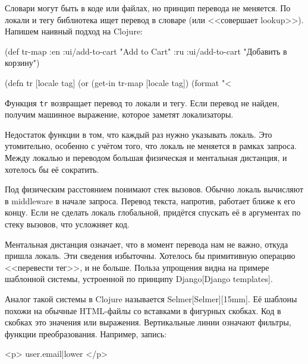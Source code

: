 Словари могут быть в коде или файлах, но принцип перевода не меняется. По локали
и тегу библиотека ищет перевод в словаре (или <<совершает lookup>>). Напишем
наивный подход на Clojure:

  \begin{clojure}
(def tr-map
  {:en {:ui/add-to-cart "Add to Cart"}
   :ru {:ui/add-to-cart "Добавить в корзину"}})

(defn tr [locale tag]
  (or (get-in tr-map [locale tag])
      (format "<%
  \end{clojure}


Функция \verb|tr| возвращает перевод то локали и тегу. Если перевод не найден,
получим машинное выражение, которое заметят локализаторы.

Недостаток функции в том, что каждый раз нужно указывать локаль. Это
утомительно, особенно с учётом того, что локаль не меняется в рамках
запроса. Между локалью и переводом большая физическая и ментальная
дистанция, и хотелось бы её сократить.


Под физическим расстоянием понимают стек вызовов. Обычно локаль вычисляют в
middleware в начале запроса. Перевод текста, напротив, работает ближе к его
концу. Если не сделать локаль глобальной, придётся спускать её в аргументах по
стеку вызовов, что усложняет код.


Ментальная дистанция означает, что в момент перевода нам не важно, откуда пришла
локаль. Эти сведения избыточны. Хотелось бы примитивную операцию <<перевести
тег>>, и не больше. Польза упрощения видна на примере шаблонной системы,
устроенной по принципу Django[Django templates].


Аналог такой системы в Clojure называется
Selmer[Selmer][15mm]. Её шаблоны похожи на
обычные HTML-файлы со вставками в фигурных скобках. Код в скобках это значения
или выражения. Вертикальные линии означают фильтры, функции
преобразования. Например, запись:

\begin{english}
  \begin{htmldjango}
<p>{{ user.email|lower }}</p>
  \end{htmldjango}
\end{english}

